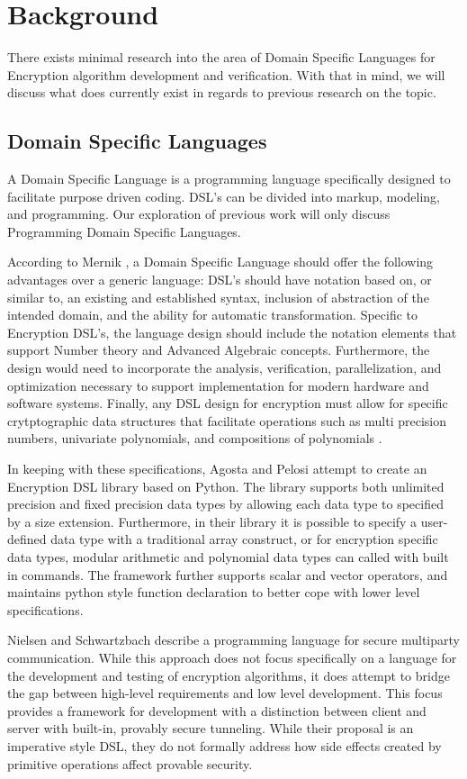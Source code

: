 \section{Background}
There exists minimal research into the area of Domain Specific Languages for Encryption algorithm development and verification. With that in mind, we will discuss what does currently exist in regards to previous research on the topic.

\subsection{Domain Specific Languages}
 A Domain Specific Language is a programming language specifically designed to facilitate purpose driven coding. DSL's can be divided into markup, modeling, and programming. Our exploration of previous work will only discuss Programming Domain Specific Languages. 

According to Mernik \cite{Mernik}, a Domain Specific Language should offer the following advantages over a generic language: DSL's should have notation based on, or similar to, an existing and established syntax, inclusion of abstraction of the intended domain, and the ability for automatic transformation. Specific to Encryption DSL's, the language design should include the notation elements that support Number theory and Advanced Algebraic concepts. Furthermore, the design would need to incorporate the analysis, verification, parallelization, and optimization necessary to support implementation for modern hardware and software systems. Finally, any DSL design for encryption must allow for specific crytptographic data structures that facilitate operations such as multi precision numbers, univariate polynomials, and compositions of polynomials \cite{Agosta}.

In keeping with these specifications, Agosta and Pelosi \cite{Agosta} attempt to create an  Encryption DSL library based on Python. The library supports both unlimited precision and fixed precision data types by allowing each data type to specified by a size extension. Furthermore, in their library it is possible to specify a user-defined data type with a traditional array construct, or for encryption specific data types, modular arithmetic and polynomial data types can called with built in commands. The framework further supports scalar and vector operators, and maintains python style function declaration to better cope with lower level specifications.

Nielsen and Schwartzbach \cite{Nielsen} describe a programming language for secure multiparty communication. While this approach does not focus specifically on a language for the development and testing  of encryption algorithms, it does attempt to bridge the gap between high-level requirements and low level development. This focus provides a framework for development with a distinction between client and server with built-in, provably secure tunneling.  While their proposal is an imperative style DSL, they do not formally address how side effects created by primitive operations affect provable security.

